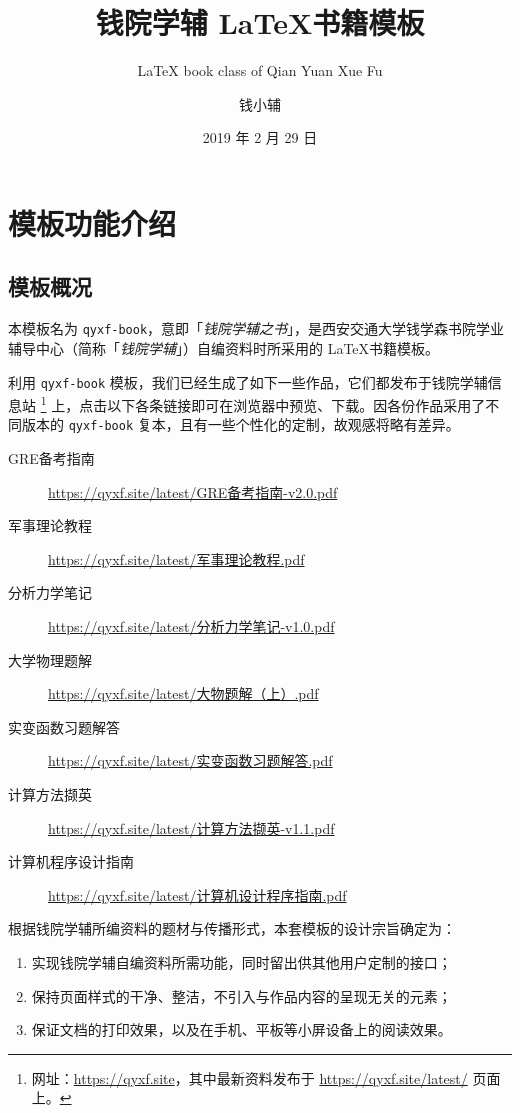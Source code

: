 \documentclass[
  10pt,
  twoside,
  openany,
  b5paper, %
  colorscheme = basic, %
]{qyxf-book}
\title{钱院学辅 \LaTeX 书籍模板}
\subtitle{\LaTeX{} book class of Qian Yuan Xue Fu}  %
\author{钱小辅}
\date{2019 年 2 月 29 日}
\begin{document}
\maketitle

\tableofcontents

\chapter{模板功能介绍}

\section{模板概况}

本模板名为 \verb|qyxf-book|，意即「\emph{钱院学辅之书}」，是西安交通大学钱学森书院学业辅导中心（简称「\emph{钱院学辅}」）自编资料时所采用的 \LaTeX 书籍模板。

利用 \verb|qyxf-book| 模板，我们已经生成了如下一些作品，它们都发布于钱院学辅信息站
\footnote{网址：\url{https://qyxf.site}，其中最新资料发布于 \url{https://qyxf.site/latest/} 页面上。}
上，点击以下各条链接即可在浏览器中预览、下载。因各份作品采用了不同版本的 \verb|qyxf-book| 复本，且有一些个性化的定制，故观感将略有差异。

\begin{tcolorbox}
  \begin{description}
    \item [GRE备考指南] \url{https://qyxf.site/latest/GRE备考指南-v2.0.pdf}
    \item [军事理论教程] \url{https://qyxf.site/latest/军事理论教程.pdf}
    \item [分析力学笔记] \url{https://qyxf.site/latest/分析力学笔记-v1.0.pdf}
    \item [大学物理题解] \url{https://qyxf.site/latest/大物题解（上）.pdf}
    \item [实变函数习题解答] \url{https://qyxf.site/latest/实变函数习题解答.pdf}
    \item [计算方法撷英] \url{https://qyxf.site/latest/计算方法撷英-v1.1.pdf}
    \item [计算机程序设计指南] \url{https://qyxf.site/latest/计算机设计程序指南.pdf}
  \end{description}
\end{tcolorbox}

根据钱院学辅所编资料的题材与传播形式，本套模板的设计宗旨确定为：
\begin{enumerate}
  \item 实现钱院学辅自编资料所需功能，同时留出供其他用户定制的接口；
  \item 保持页面样式的干净、整洁，不引入与作品内容的呈现无关的元素；
  \item 保证文档的打印效果，以及在手机、平板等小屏设备上的阅读效果。
\end{enumerate}
\end{document}
